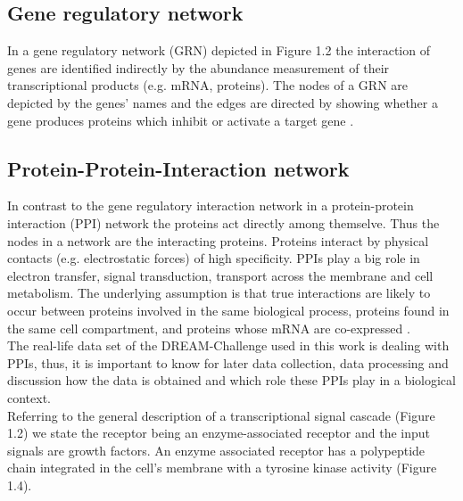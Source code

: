 \subsection*{Gene regulatory network}

In a gene regulatory network (\gls{GRN}) depicted in Figure 1.2 the interaction of genes are identified indirectly by the abundance measurement of their transcriptional products (e.g. mRNA, proteins). The nodes of a GRN are depicted by the genes' names and the edges are directed by showing whether a gene produces proteins which inhibit or activate a target gene  \citep{Karlebach.2008}.



\subsection*{Protein-Protein-Interaction network}
In contrast to the gene regulatory interaction network in a protein-protein interaction (\gls{PPI}) network the proteins act directly among themselve. Thus the nodes in a network are the interacting proteins. Proteins interact by physical contacts (e.g. electrostatic forces) of high specificity. PPIs play a big role in electron transfer, signal transduction, transport across the membrane and cell metabolism. The underlying assumption is that true interactions are likely to occur between proteins involved in the same biological process, proteins found in the same cell compartment, and proteins whose mRNA are co-expressed \citep{LasRivas.2010}\citep{Pellegrini.2004}.\\

The real-life data set of the DREAM-Challenge used in this work is dealing with PPIs, thus, it is important to know for later data collection, data processing and discussion how the data is obtained and which role these PPIs play in a biological context.\\

Referring to the general description of a transcriptional signal cascade (Figure 1.2) we state the receptor being an enzyme-associated receptor and the input signals are growth factors. An enzyme associated receptor has a polypeptide chain integrated in the cell's membrane with a tyrosine kinase activity (Figure 1.4).


